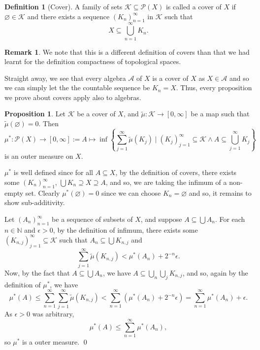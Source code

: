 \documentclass[
]{article}
\theoremstyle{definition}
\newtheorem{prop}{Proposition}
\newtheorem*{remark}{Remark}
\theoremstyle{definition}
\newtheorem{definition}{Definition}[section]
\begin{document}
\begin{definition}[Cover]
  A family of sets \(\mathcal{K} \subseteq \mathcal{P}(X)\) is called a cover 
  of \(X\) if \(\varnothing \in \mathcal{K}\) and there exists a sequence 
  \((K_n)_{n = 1}^\infty\) in \(\mathcal{K}\) such that 
  \[X \subseteq \bigcup_{n = 1}^\infty K_n.\]
\end{definition}
\begin{remark}
  We note that this is a different definition of covers than that we had learnt 
  for the definition compactness of topological spaces.
\end{remark}

Straight away, we see that every algebra \(\mathcal{A}\) of \(X\) is a
cover of \(X\) as \(X \in \mathcal{A}\) and so we can simply let the the
countable sequence be \(K_n = X\). Thus, every proposition we prove
about covers apply also to algebras.

\begin{prop}\label{cath_mea}
  Let \(\mathcal{K}\) be a cover of \(X\), and \(\tilde{\mu} : \mathcal{K} \to [0, \infty]\) 
  be a map such that \(\tilde{\mu}(\varnothing) = 0\). Then  
  \[\mu^* : \mathcal{P}(X) \to [0, \infty] := A \mapsto 
    \inf \left\{\sum_{j = 1}^\infty \tilde{\mu}(K_j) \mid (K_j)_{j = 1}^\infty 
    \subseteq \mathcal{K} \wedge A \subseteq \bigcup_{j = 1}^\infty K_j \right\}\]
  is an outer measure on \(X\).
\end{prop}
\proof

\(\mu^*\) is well defined since for all \(A \subseteq X\), by the
definition of covers, there exists some \((K_n)_{n = 1}^\infty\),
\(\bigcup K_n \supseteq X \supseteq A\), and so, we are taking the
infimum of a non-empty set. Clearly \(\mu^*(\varnothing) = 0\) since we
can choose \(K_n = \varnothing\) and so, it remains to show
sub-additivity.

Let \((A_n)_{n = 1}^\infty\) be a sequence of subsets of \(X\), and
suppose \(A \subseteq \bigcup A_n\). For each \(n \in \mathbb{N}\) and
\(\epsilon > 0\), by the definition of infimum, there exists some
\((K_{n, j})_{j = 1}^\infty \subseteq \mathcal{K}\) such that
\(A_n \subseteq \bigcup K_{n, j}\) and
\[\sum_{j = 1}^\infty \tilde{\mu}(K_{n, j}) < \mu^*(A_n) + 2^{-n} \epsilon.\]
Now, by the fact that \(A \subseteq \bigcup A_n\), we have
\(A \subseteq \bigcup_n \bigcup_j K_{n, j}\), and so, again by the
definition of \(\mu^*\), we have
\[\mu^*(A) \le \sum_{n = 1}^\infty \sum_{j = 1}^\infty\tilde{\mu}(K_{n, j})
    < \sum_{n = 1}^\infty (\mu^*(A_n) + 2^{-n}\epsilon) 
    = \sum_{n = 1}^\infty \mu^*(A_n) + \epsilon.\] As \(\epsilon > 0\)
was arbitrary, \[\mu^*(A) \le \sum_{n = 1}^\infty \mu^*(A_n),\] so
\(\mu^*\) is a outer measure. \qed
\end{document}
